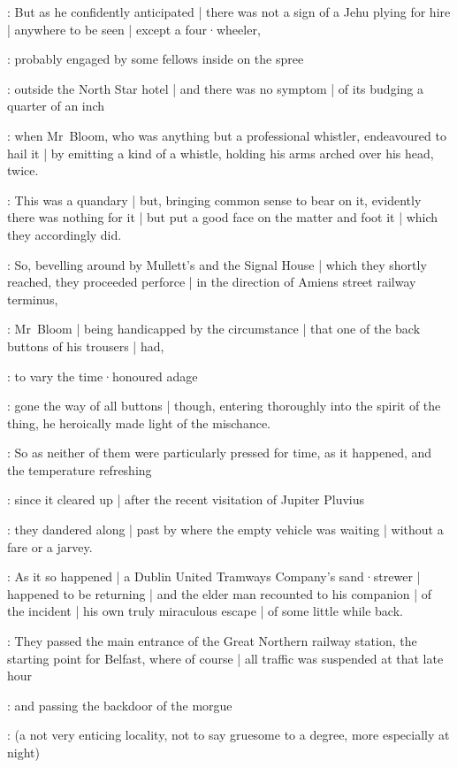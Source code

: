 :
But as he confidently anticipated |
there was not a sign of a Jehu plying for hire |
anywhere to be seen |
except a four·wheeler,

:
probably engaged by some fellows inside on the spree

:
outside the North Star hotel |
and there was no symptom |
of its budging a quarter of an inch

:
when Mr~Bloom,
who was anything but a professional whistler,
endeavoured to hail it |
by emitting a kind of a whistle,
holding his arms arched over his head,
twice.%

:
This was a quandary |
but,
bringing common sense to bear on it,
evidently there was nothing for it |
but put a good face on the matter and foot it |
which they accordingly did.

:
So,
bevelling around by Mullett's and the Signal House |
which they shortly reached,
they proceeded perforce |
in the direction of Amiens street railway terminus,

:
Mr~Bloom |
being handicapped by the circumstance |
that one of the back buttons of his trousers |
had,

:
to vary the time·honoured adage

:
gone the way of all buttons |
though,
entering thoroughly into the spirit of the thing,
he heroically made light of the mischance.

:
So as neither of them were particularly pressed for time,
as it happened,
and the temperature refreshing%

:
since it cleared up |
after the recent visitation of Jupiter Pluvius

:
they dandered along |
past by where the empty vehicle was waiting |
without a fare or a jarvey.

:
As it so happened |
a Dublin United Tramways Company's sand·strewer |
happened to be returning |
and the elder man recounted to his companion |
 of the incident |
his own truly miraculous escape |
of some little while back.

:
They passed the main entrance of the Great Northern railway station,
the starting point for Belfast,
where of course |
all traffic was suspended at that late hour

:
and passing the backdoor of the morgue

:
(a not very enticing locality,
not to say gruesome to a degree,
more especially at night)

